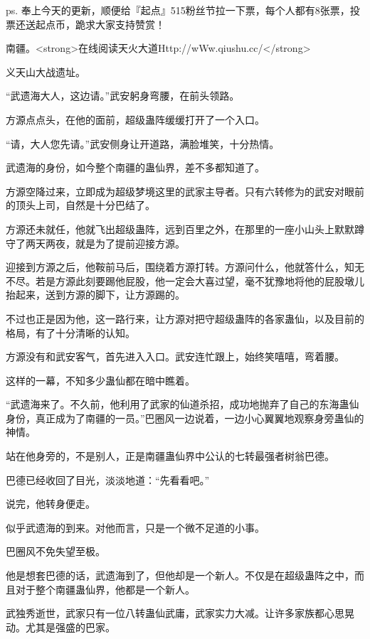 
\begin{this_body}

ps. 奉上今天的更新，顺便给『起点』515粉丝节拉一下票，每个人都有8张票，投票还送起点币，跪求大家支持赞赏！

南疆。<strong>在线阅读天火大道Http://wWw.qiushu.cc/</strong>

义天山大战遗址。

“武遗海大人，这边请。”武安躬身弯腰，在前头领路。

方源点点头，在他的面前，超级蛊阵缓缓打开了一个入口。

“请，大人您先请。”武安侧身让开道路，满脸堆笑，十分热情。

武遗海的身份，如今整个南疆的蛊仙界，差不多都知道了。

方源空降过来，立即成为超级梦境这里的武家主导者。只有六转修为的武安对眼前的顶头上司，自然是十分巴结了。

方源还未就任，他就飞出超级蛊阵，远到百里之外，在那里的一座小山头上默默蹲守了两天两夜，就是为了提前迎接方源。

迎接到方源之后，他鞍前马后，围绕着方源打转。方源问什么，他就答什么，知无不尽。若是方源此刻要踢他屁股，他一定会大喜过望，毫不犹豫地将他的屁股墩儿抬起来，送到方源的脚下，让方源踢的。

不过也正是因为他，这一路行来，让方源对把守超级蛊阵的各家蛊仙，以及目前的格局，有了十分清晰的认知。

方源没有和武安客气，首先进入入口。武安连忙跟上，始终笑嘻嘻，弯着腰。

这样的一幕，不知多少蛊仙都在暗中瞧着。

“武遗海来了。不久前，他利用了武家的仙道杀招，成功地抛弃了自己的东海蛊仙身份，真正成为了南疆的一员。”巴圈风一边说着，一边小心翼翼地观察身旁蛊仙的神情。

站在他身旁的，不是别人，正是南疆蛊仙界中公认的七转最强者树翁巴德。

巴德已经收回了目光，淡淡地道：“先看看吧。”

说完，他转身便走。

似乎武遗海的到来。对他而言，只是一个微不足道的小事。

巴圈风不免失望至极。

他是想套巴德的话，武遗海到了，但他却是一个新人。不仅是在超级蛊阵之中，而且对于整个南疆蛊仙界，他都是一个新人。

武独秀逝世，武家只有一位八转蛊仙武庸，武家实力大减。让许多家族都心思晃动。尤其是强盛的巴家。


\end{this_body}
